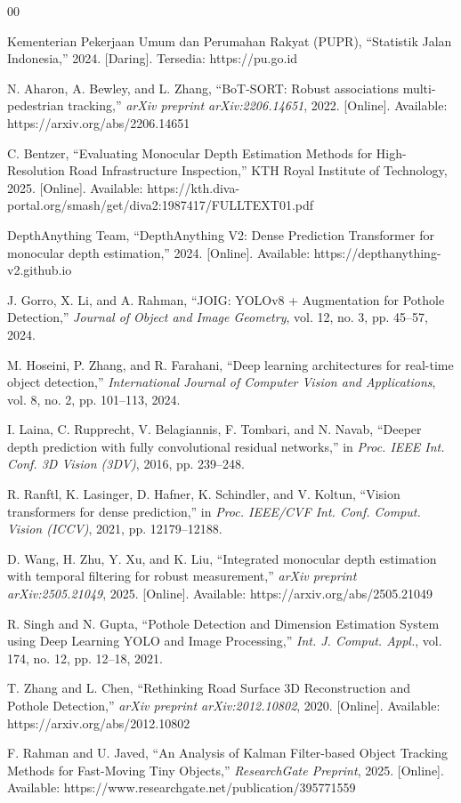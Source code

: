 \documentclass[conference]{IEEEtran}
\begin{document}
\begin{thebibliography}{00}

Kementerian Pekerjaan Umum dan Perumahan Rakyat (PUPR), ``Statistik Jalan Indonesia,'' 2024. [Daring]. Tersedia: https://pu.go.id

N. Aharon, A. Bewley, and L. Zhang, ``BoT-SORT: Robust associations multi-pedestrian tracking,'' \emph{arXiv preprint arXiv:2206.14651}, 2022. [Online]. Available: https://arxiv.org/abs/2206.14651

C. Bentzer, ``Evaluating Monocular Depth Estimation Methods for High-Resolution Road Infrastructure Inspection,'' KTH Royal Institute of Technology, 2025. [Online]. Available: https://kth.diva-portal.org/smash/get/diva2:1987417/FULLTEXT01.pdf

DepthAnything Team, ``DepthAnything V2: Dense Prediction Transformer for monocular depth estimation,'' 2024. [Online]. Available: https://depthanything-v2.github.io

J. Gorro, X. Li, and A. Rahman, ``JOIG: YOLOv8 + Augmentation for Pothole Detection,'' \emph{Journal of Object and Image Geometry}, vol. 12, no. 3, pp. 45--57, 2024.

M. Hoseini, P. Zhang, and R. Farahani, ``Deep learning architectures for real-time object detection,'' \emph{International Journal of Computer Vision and Applications}, vol. 8, no. 2, pp. 101--113, 2024.

I. Laina, C. Rupprecht, V. Belagiannis, F. Tombari, and N. Navab, ``Deeper depth prediction with fully convolutional residual networks,'' in \emph{Proc. IEEE Int. Conf. 3D Vision (3DV)}, 2016, pp. 239--248.

R. Ranftl, K. Lasinger, D. Hafner, K. Schindler, and V. Koltun, ``Vision transformers for dense prediction,'' in \emph{Proc. IEEE/CVF Int. Conf. Comput. Vision (ICCV)}, 2021, pp. 12179--12188.

D. Wang, H. Zhu, Y. Xu, and K. Liu, ``Integrated monocular depth estimation with temporal filtering for robust measurement,'' \emph{arXiv preprint arXiv:2505.21049}, 2025. [Online]. Available: https://arxiv.org/abs/2505.21049

R. Singh and N. Gupta, ``Pothole Detection and Dimension Estimation System using Deep Learning YOLO and Image Processing,'' \emph{Int. J. Comput. Appl.}, vol. 174, no. 12, pp. 12--18, 2021.

T. Zhang and L. Chen, ``Rethinking Road Surface 3D Reconstruction and Pothole Detection,'' \emph{arXiv preprint arXiv:2012.10802}, 2020. [Online]. Available: https://arxiv.org/abs/2012.10802

F. Rahman and U. Javed, ``An Analysis of Kalman Filter-based Object Tracking Methods for Fast-Moving Tiny Objects,'' \emph{ResearchGate Preprint}, 2025. [Online]. Available: https://www.researchgate.net/publication/395771559

\end{thebibliography}
\end{document}
